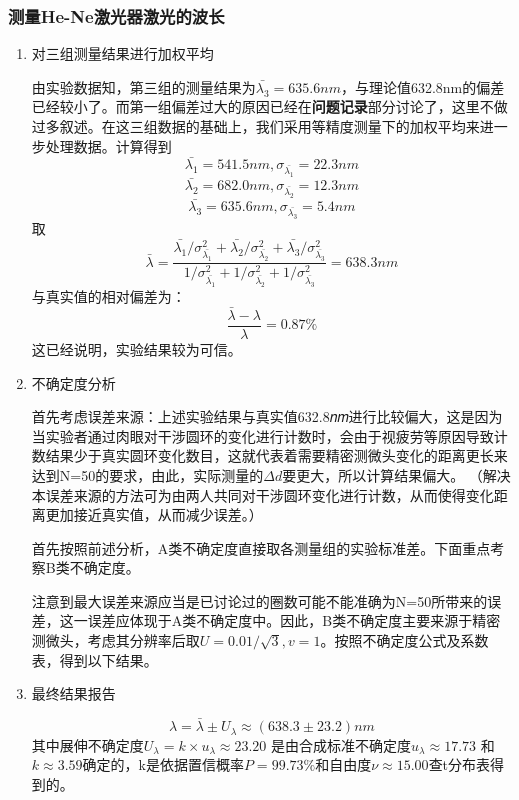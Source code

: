 \documentclass[dvipsnames, svgnames,a4paper,11pt]{article}
\begin{document}
	\subsubsection{测量He-Ne激光器激光的波长}
	\begin{enumerate}
		\item 对三组测量结果进行加权平均
		
		由实验数据知，第三组的测量结果为$\bar{\lambda_{3}}=635.6nm$，与理论值632.8nm的偏差已经较小了。而第一组偏差过大的原因已经在\textbf{问题记录}部分讨论了，这里不做过多叙述。在这三组数据的基础上，我们采用等精度测量下的加权平均来进一步处理数据。计算得到
		\[\bar{\lambda_{1}}=541.5nm, \sigma_{\bar{\lambda_{1}}}=22.3nm\]
		\[\bar{\lambda_{2}}=682.0nm, \sigma_{\bar{\lambda_{2}}}=12.3nm\]
		\[\bar{\lambda_{3}}=635.6nm, \sigma_{\bar{\lambda_{3}}}=5.4nm\]
		取
		\[\bar{\lambda}=\frac{\bar{\lambda_{1}}/\sigma_{\bar{\lambda_{1}}}^{2}+\bar{\lambda_{2}}/\sigma_{\bar{\lambda_{2}}}^{2}+\bar{\lambda_{3}}/\sigma_{\bar{\lambda_{3}}}^{2}}{1/\sigma_{\bar{\lambda_{1}}}^{2}+1/\sigma_{\bar{\lambda_{2}}}^{2}+1/\sigma_{\bar{\lambda_{3}}}^{2}}=638.3nm\]
		与真实值的相对偏差为：
		\[\frac{\bar{\lambda}-\lambda}{\lambda}=0.87\%\]
		这已经说明，实验结果较为可信。
		\item 不确定度分析
		
		首先考虑误差来源：上述实验结果与真实值632.8𝑛𝑚进行比较偏大，这是因为当实验者通过肉眼对干涉圆环的变化进行计数时，会由于视疲劳等原因导致计数结果少于真实圆环变化数目，这就代表着需要精密测微头变化的距离更长来达到N=50的要求，由此，实际测量的$\Delta d$要更大，所以计算结果偏大。
		（解决本误差来源的方法可为由两人共同对干涉圆环变化进行计数，从而使得变化距离更加接近真实值，从而减少误差。）
		
		首先按照前述分析，A类不确定度直接取各测量组的实验标准差。下面重点考察B类不确定度。
		
		注意到最大误差来源应当是已讨论过的圈数可能不能准确为N=50所带来的误差，这一误差应体现于A类不确定度中。因此，B类不确定度主要来源于精密测微头，考虑其分辨率后取$U=0.01/\sqrt{3}, v=1$。按照不确定度公式及系数表，得到以下结果。
		\item 最终结果报告
		
		\begin{equation*}
			\lambda=\bar{\lambda}\pm U_{\lambda}\approx( 638.3 \pm  23.2 )nm
		\end{equation*} 
		其中展伸不确定度$U_{\lambda}={k}\times{u_{\lambda}}\approx 23.20 $ 是由合成标准不确定度$u_{\lambda}\approx 17.73 $ 和$k\approx3.59$确定的，k是依据置信概率$P=99.73\%$和自由度$\nu\approx15.00$查t分布表得到的。		
	\end{enumerate}
	
\end{document}

